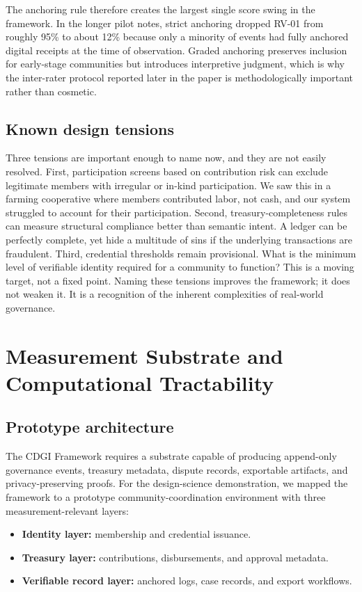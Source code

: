 \documentclass[sigconf,anonymous]{acmart}
\begin{document}
The anchoring rule therefore creates the largest single score swing in the framework. In the longer pilot notes, strict anchoring dropped RV-01 from roughly 95\% to about 12\% because only a minority of events had fully anchored digital receipts at the time of observation. Graded anchoring preserves inclusion for early-stage communities but introduces interpretive judgment, which is why the inter-rater protocol reported later in the paper is methodologically important rather than cosmetic.

\subsection{Known design tensions}

Three tensions are important enough to name now, and they are not easily resolved. First, participation screens based on contribution risk can exclude legitimate members with irregular or in-kind participation. We saw this in a farming cooperative where members contributed labor, not cash, and our system struggled to account for their participation. Second, treasury-completeness rules can measure structural compliance better than semantic intent. A ledger can be perfectly complete, yet hide a multitude of sins if the underlying transactions are fraudulent. Third, credential thresholds remain provisional. What is the minimum level of verifiable identity required for a community to function? This is a moving target, not a fixed point. Naming these tensions improves the framework; it does not weaken it. It is a recognition of the inherent complexities of real-world governance.

\section{Measurement Substrate and Computational Tractability}

\subsection{Prototype architecture}

The CDGI Framework requires a substrate capable of producing append-only governance events, treasury metadata, dispute records, exportable artifacts, and privacy-preserving proofs. For the design-science demonstration, we mapped the framework to a prototype community-coordination environment with three measurement-relevant layers:

\begin{itemize}
\item \textbf{Identity layer:} membership and credential issuance.
\item \textbf{Treasury layer:} contributions, disbursements, and approval metadata.
\item \textbf{Verifiable record layer:} anchored logs, case records, and export workflows.
\end{itemize}
\end{document}
